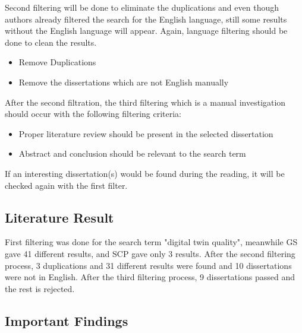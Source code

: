 \documentclass[9pt,conference]{IEEEtran}
\begin{document}
    Second filtering will be done to eliminate the duplications and even though authors already filtered the search for the English language, 
    still some results without the English language will appear. Again, language filtering should be done to clean the results.
    \begin{itemize}
        \item Remove Duplications
        \item Remove the dissertations which are not English manually
    \end{itemize}

    After the second filtration, the third filtering which is a manual investigation should occur with the following filtering criteria:
    \begin{itemize}
        \item  Proper literature review should be present in the selected dissertation
        \item  Abstract and conclusion should be relevant to the search term
    \end{itemize}

    If an interesting dissertation(s) would be found during the reading, it will be checked again with the first filter.

    \subsection*{Literature Result}
    First filtering was done for the search term "digital twin quality", meanwhile GS gave 41 different results, and SCP gave only 3 results. After the second filtering process, 3 duplications and 31 different results were found and 10 dissertations were not in English. 
    After the third filtering process, 9 dissertations passed and the rest is rejected.

    \subsection*{Important Findings}
\end{document}
